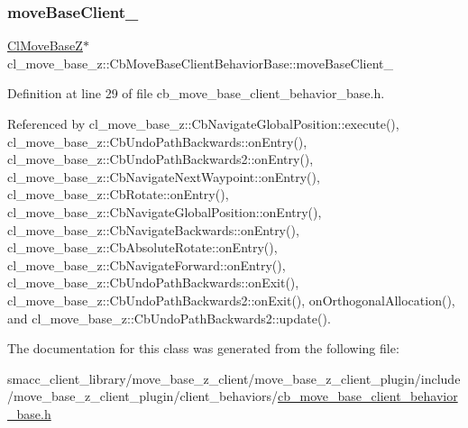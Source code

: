 \subsubsection{\texorpdfstring{move\+Base\+Client\+\_\+}{moveBaseClient\_}}
{\footnotesize\ttfamily \hyperlink{classcl__move__base__z_1_1ClMoveBaseZ}{Cl\+Move\+BaseZ}$\ast$ cl\+\_\+move\+\_\+base\+\_\+z\+::\+Cb\+Move\+Base\+Client\+Behavior\+Base\+::move\+Base\+Client\+\_\+\hspace{0.3cm}{\ttfamily [protected]}}



Definition at line 29 of file cb\+\_\+move\+\_\+base\+\_\+client\+\_\+behavior\+\_\+base.\+h.



Referenced by cl\+\_\+move\+\_\+base\+\_\+z\+::\+Cb\+Navigate\+Global\+Position\+::execute(), cl\+\_\+move\+\_\+base\+\_\+z\+::\+Cb\+Undo\+Path\+Backwards\+::on\+Entry(), cl\+\_\+move\+\_\+base\+\_\+z\+::\+Cb\+Undo\+Path\+Backwards2\+::on\+Entry(), cl\+\_\+move\+\_\+base\+\_\+z\+::\+Cb\+Navigate\+Next\+Waypoint\+::on\+Entry(), cl\+\_\+move\+\_\+base\+\_\+z\+::\+Cb\+Rotate\+::on\+Entry(), cl\+\_\+move\+\_\+base\+\_\+z\+::\+Cb\+Navigate\+Global\+Position\+::on\+Entry(), cl\+\_\+move\+\_\+base\+\_\+z\+::\+Cb\+Navigate\+Backwards\+::on\+Entry(), cl\+\_\+move\+\_\+base\+\_\+z\+::\+Cb\+Absolute\+Rotate\+::on\+Entry(), cl\+\_\+move\+\_\+base\+\_\+z\+::\+Cb\+Navigate\+Forward\+::on\+Entry(), cl\+\_\+move\+\_\+base\+\_\+z\+::\+Cb\+Undo\+Path\+Backwards\+::on\+Exit(), cl\+\_\+move\+\_\+base\+\_\+z\+::\+Cb\+Undo\+Path\+Backwards2\+::on\+Exit(), on\+Orthogonal\+Allocation(), and cl\+\_\+move\+\_\+base\+\_\+z\+::\+Cb\+Undo\+Path\+Backwards2\+::update().



The documentation for this class was generated from the following file\+:\begin{DoxyCompactItemize}
\item 
smacc\+\_\+client\+\_\+library/move\+\_\+base\+\_\+z\+\_\+client/move\+\_\+base\+\_\+z\+\_\+client\+\_\+plugin/include/move\+\_\+base\+\_\+z\+\_\+client\+\_\+plugin/client\+\_\+behaviors/\hyperlink{cb__move__base__client__behavior__base_8h}{cb\+\_\+move\+\_\+base\+\_\+client\+\_\+behavior\+\_\+base.\+h}\end{DoxyCompactItemize}
